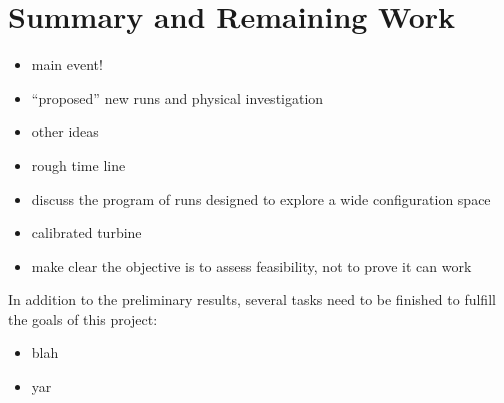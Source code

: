 \section{Summary and Remaining Work}
\label{sec:future_work}

\begin{itemize}
\item main event!
\item ``proposed'' new runs and physical investigation
\item other ideas
\item rough time line
\item discuss the program of runs designed to explore a wide configuration space
\item calibrated turbine
\item make clear the objective is to assess feasibility, not to prove it can work
\end{itemize}

In addition to the preliminary results, several tasks need to
be finished to fulfill the goals of this project:

\begin{itemize}
\item blah
\item yar
\end{itemize}
